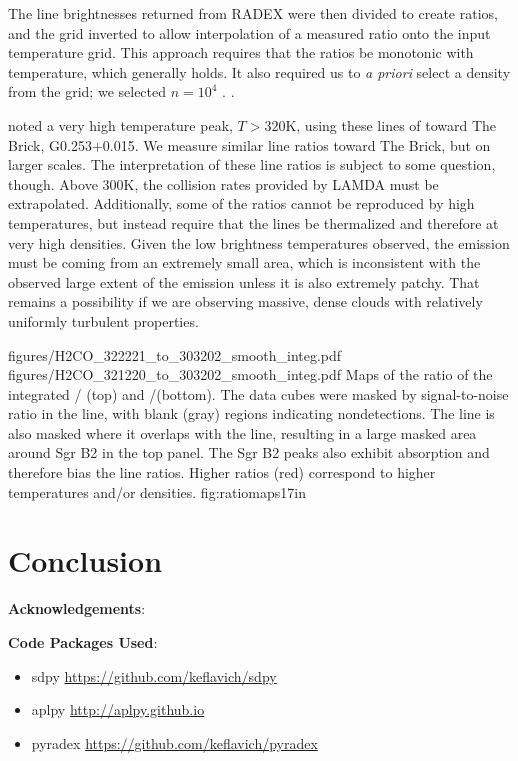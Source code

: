 The line brightnesses returned from RADEX were then divided to create ratios,
and the grid inverted to allow interpolation of a measured ratio onto the input
temperature grid.   This approach requires that the ratios be monotonic with
temperature, which generally holds.  It also required us to \emph{a priori} select
a density from the grid; we selected $n=10^4$ \percc.  .

\citet{Johnston2014a} noted a very high temperature peak, $T>320$K, using these
lines of \formaldehyde toward The Brick, G0.253+0.015.  We measure similar line
ratios toward The Brick, but on larger scales.  The interpretation of these
line ratios is subject to some question, though.  Above 300K, the collision
rates provided by LAMDA \citep{Schoier2005a,Wiesenfeld2013a} must be
extrapolated.  Additionally, some of the ratios cannot be reproduced by high
temperatures, but instead require that the lines be thermalized and therefore
at very high densities.   Given the low brightness temperatures observed,
the emission must be coming from an extremely small area, which is inconsistent
with the observed large extent of the emission unless it is also extremely
patchy.  That remains a possibility if we are observing massive, dense clouds
with relatively uniformly turbulent properties.

\FigureTwoAA
{figures/H2CO_322221_to_303202_smooth_integ.pdf}
{figures/H2CO_321220_to_303202_smooth_integ.pdf}
{Maps of the ratio of the integrated \para \threetwotwo / \threeohthree (top)
and \threetwoone/\threeohthree (bottom).  The data cubes were masked by
signal-to-noise ratio in the \threeohthree line, with blank (gray) regions
indicating nondetections.  The \threetwotwo line is also masked where it
overlaps with the \methanol \fourtwotwo line, resulting in a large masked area
around Sgr B2 in the top panel.  The Sgr B2 peaks also exhibit \formaldehyde absorption and therefore
bias the line ratios.  Higher ratios (red) correspond to higher
temperatures and/or densities.  
}
{fig:ratiomaps}{1}{7in}


\section{Conclusion}


\textbf{Acknowledgements}:

\textbf{Code Packages Used}:

\begin{itemize}
    \item sdpy \url{https://github.com/keflavich/sdpy}
    \item aplpy \url{http://aplpy.github.io}
    \item pyradex \url{https://github.com/keflavich/pyradex}
\end{itemize}





